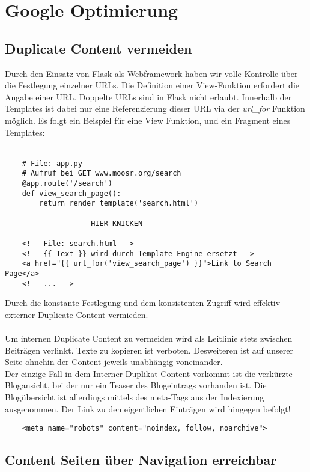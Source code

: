 \chapter{Google Optimierung}

\section{Duplicate Content vermeiden}
Durch den Einsatz von Flask als Webframework haben wir volle Kontrolle über
die Festlegung einzelner URLs. Die Definition einer View-Funktion erfordert die
Angabe einer URL. Doppelte URLs sind in Flask nicht erlaubt. Innerhalb der
Templates ist dabei nur eine Referenzierung dieser URL via der \emph{url\_for}
Funktion möglich. Es folgt ein Beispiel für eine View Funktion, und ein Fragment
eines Templates:
\\
\\
\begin{verbatim}
    # File: app.py
    # Aufruf bei GET www.moosr.org/search
    @app.route('/search')
    def view_search_page():
        return render_template('search.html')

    --------------- HIER KNICKEN -----------------

    <!-- File: search.html -->
    <!-- {{ Text }} wird durch Template Engine ersetzt -->
    <a href="{{ url_for('view_search_page') }}">Link to Search Page</a>
    <!-- ... -->
\end{verbatim}

Durch die konstante Festlegung und dem konsistenten Zugriff wird effektiv
externer Duplicate Content vermieden. 
\\
\\
Um internen Duplicate Content zu vermeiden wird als Leitlinie stets zwischen
Beiträgen verlinkt. Texte zu kopieren ist verboten. Desweiteren ist auf unserer 
Seite ohnehin der Content jeweils unabhängig voneinander.
\\
Der einzige Fall in dem Interner Duplikat Content vorkommt ist die verkürzte
Blogansicht, bei der nur ein Teaser des Blogeintrags vorhanden ist. Die
Blogübersicht ist allerdings mittels des meta-Tags aus der Indexierung
ausgenommen. Der Link zu den eigentlichen Einträgen wird hingegen befolgt!

\begin{verbatim}
    <meta name="robots" content="noindex, follow, noarchive">
\end{verbatim}

\section{Content Seiten über Navigation erreichbar}

